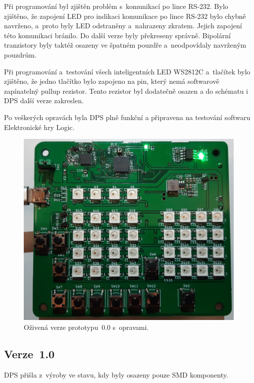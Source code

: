   Při programování byl zjištěn problém s~komunikací po lince RS-232. Bylo zjištěno, že zapojení LED pro indikaci komunikace po lince RS-232 bylo 
  chybně navrženo, a~proto byly LED odstraněny a~nahrazeny zkratem. Jejich zapojení této komunikaci bránilo. Do další verze byly překreseny správně.
  Bipolární tranzistory byly taktéž osazeny ve špatném pouzdře a~neodpovídaly navrženým pouzdrům. 
  
  Při programování a~testování všech inteligentních LED WS2812C a~tlačítek bylo zjištěno, že jedno tlačítko bylo zapojeno na pin, který 
  nemá softwarově zapínatelný pullup rezistor. Tento rezistor byl dodatečně osazen a do schématu i DPS další verze zakreslen. 
  
  Po veškerých opravách byla DPS plně funkční a připravena na testování softwaru Elektronické hry Logic.

  \begin{figure}[!h]
    \begin{center}
      \includegraphics[scale=0.1]{obrazky/Verze0_zapnuto_nabito.jpg}
    \end{center}
    \caption[Oživená verze prototypu~0.0 s~opravami]{Oživená verze prototypu~0.0 s~opravami.}
  \end{figure}

  \subsection{Verze~1.0}
  DPS přišla z~výroby ve stavu, kdy byly osazeny pouze SMD komponenty. 

